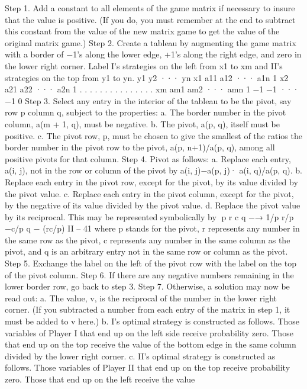 \documentclass[]{report}
\begin{document}
Step 1. Add a constant to all elements of the game matrix if necessary to insure that the
value is positive. (If you do, you must remember at the end to subtract this constant from
the value of the new matrix game to get the value of the original matrix game.)
Step 2. Create a tableau by augmenting the game matrix with a border of −1’s along
the lower edge, +1’s along the right edge, and zero in the lower right corner. Label I’s
strategies on the left from x1 to xm and II’s strategies on the top from y1 to yn.
y1 y2 ··· yn
x1 a11 a12 ··· a1n 1
x2 a21 a22 ··· a2n 1
.
.
. .
.
. .
.
. .
.
. .
.
.
xm am1 am2 ··· amn 1
−1 −1 ··· −1 0
Step 3. Select any entry in the interior of the tableau to be the pivot, say row p column q,
subject to the properties:
a. The border number in the pivot column, a(m + 1, q), must be negative.
b. The pivot, a(p, q), itself must be positive.
c. The pivot row, p, must be chosen to give the smallest of the ratios the border
number in the pivot row to the pivot, a(p, n+1)/a(p, q), among all positive pivots for that
column.
Step 4. Pivot as follows:
a. Replace each entry, a(i, j), not in the row or column of the pivot by a(i, j)−a(p, j)·
a(i, q)/a(p, q).
b. Replace each entry in the pivot row, except for the pivot, by its value divided by
the pivot value.
c. Replace each entry in the pivot column, except for the pivot, by the negative of its
value divided by the pivot value.
d. Replace the pivot value by its reciprocal.
This may be represented symbolically by
p r
c q −→ 1/p r/p
−c/p q − (rc/p)
II – 41
where p stands for the pivot, r represents any number in the same row as the pivot, c
represents any number in the same column as the pivot, and q is an arbitrary entry not in
the same row or column as the pivot.
Step 5. Exchange the label on the left of the pivot row with the label on the top of the
pivot column.
Step 6. If there are any negative numbers remaining in the lower border row, go back to
step 3.
Step 7. Otherwise, a solution may now be read out:
a. The value, v, is the reciprocal of the number in the lower right corner. (If you
subtracted a number from each entry of the matrix in step 1, it must be added to v here.)
b. I’s optimal strategy is constructed as follows. Those variables of Player I that end
up on the left side receive probability zero. Those that end up on the top receive the value
of the bottom edge in the same column divided by the lower right corner.
c. II’s optimal strategy is constructed as follows. Those variables of Player II that
end up on the top receive probability zero. Those that end up on the left receive the value
\end{document}
